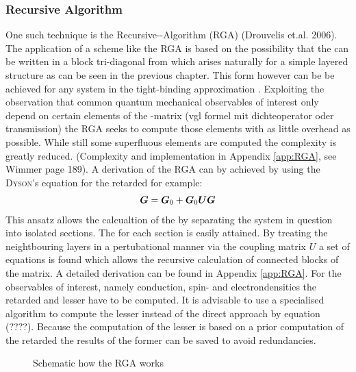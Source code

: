 \subsubsection{Recursive \cgfnc{} Algorithm}
\label{sec:rgapresentation}
One such technique is the Recursive-\gfnc-Algorithm (RGA) (Drouvelis et.al. 2006)\cite{MacKinnon1985}.
The application of a scheme like the RGA is based on the possibility that the \hamil{} can be written in a block tri-diagonal from which arises naturally for a simple layered structure as can be seen in the previous chapter. This form however can be be achieved for any system in the tight-binding approximation \cite{Wimmer2009Thesis}.
Exploiting the observation that common quantum mechanical observables of interest only depend on certain elements of the \gfnc-matrix (vgl formel mit dichteoperator oder transmission) the RGA seeks to compute those elements with as little overhead as possible. While still some superfluous elements are computed the complexity is greatly reduced. (Complexity and implementation in Appendix \ref{app:RGA}, see Wimmer page 189). A derivation of the RGA can by achieved by using the \textsc{Dyson}'s equation for the retarded \gfnc{} for example:
\begin{align}
	\boldsymbol{G} = \boldsymbol{G}_0+\boldsymbol{G}_0\boldsymbol{U}\boldsymbol{G}
	\label{eqn:DysonEquationG}
\end{align}
This ansatz allows the calcualtion of the \gfnc{} by separating the system in question into isolated sections. The \gfnc{} for each section is easily attained. By treating the neightbouring layers in a pertubational manner via the coupling matrix $U$ a set of equations is found which allows the recursive calculation of connected blocks of the \gfnc{} matrix. A detailed derivation can be found in Appendix \ref{app:RGA}.
For the observables of interest, namely conduction, spin- and electrondensities the retarded and lesser \gfnc{} have to be computed.
It is advisable to use a specialised algorithm to compute the lesser \gfnc{} instead of the direct approach by equation (????). Because the computation of the lesser \gfnc{} is based on a prior computation of the retarded \gfnc{} the results of the former can be saved to avoid redundancies.
\begin{figure}
\caption{Schematic how the RGA works}
\label{fig:rgaschematic}
\end{figure}
